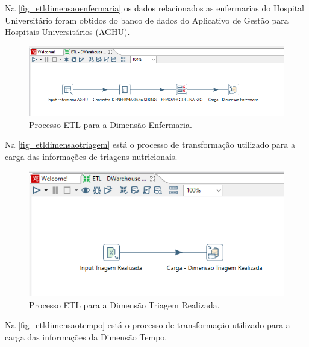 Na \autoref{fig_etldimensaoenfermaria} os dados relacionados as enfermarias do Hospital Universitário foram obtidos do banco de dados do Aplicativo de Gestão para Hospitais Universitários (AGHU). 
\begin{figure}[htb]
	\caption{\label{fig_etldimensaoenfermaria}Processo ETL para a Dimensão Enfermaria.}
	\begin{center}
	    \includegraphics[scale=0.7]{Imagens/figura - etl dw enfermaria.png}
	\end{center}
\end{figure}

Na \autoref{fig_etldimensaotriagem} está o processo de transformação utilizado para a carga das informações de triagens nutricionais.

\begin{figure}[htb]
	\caption{\label{fig_etldimensaotriagem}Processo ETL para a Dimensão Triagem Realizada.}
	\begin{center}
	    \includegraphics[scale=0.7]{Imagens/figura - etl dw triagem.png}
	\end{center}
\end{figure}

Na \autoref{fig_etldimensaotempo} está o processo de transformação utilizado para a carga das informações da Dimensão Tempo.


